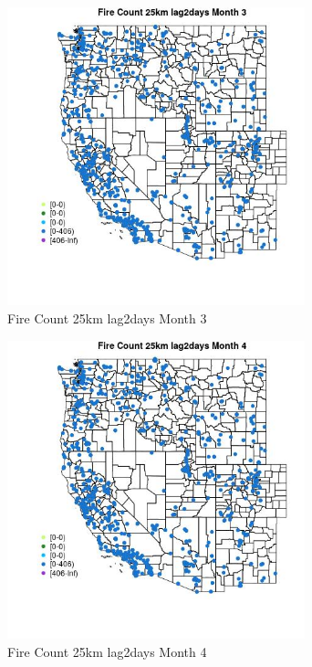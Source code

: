 \begin{figure} 
\centering  
\includegraphics[width=0.77\textwidth]{Code_Outputs/Report_ML_input_PM25_Step4_part_f_de_duplicated_aveswNAs_MapObsMo3Fire_Count_25km_lag2days.jpg} 
\caption{\label{fig:Report_ML_input_PM25_Step4_part_f_de_duplicated_aveswNAsMapObsMo3Fire_Count_25km_lag2days}Fire Count 25km lag2days Month 3} 
\end{figure} 
 

\begin{figure} 
\centering  
\includegraphics[width=0.77\textwidth]{Code_Outputs/Report_ML_input_PM25_Step4_part_f_de_duplicated_aveswNAs_MapObsMo4Fire_Count_25km_lag2days.jpg} 
\caption{\label{fig:Report_ML_input_PM25_Step4_part_f_de_duplicated_aveswNAsMapObsMo4Fire_Count_25km_lag2days}Fire Count 25km lag2days Month 4} 
\end{figure} 
 

